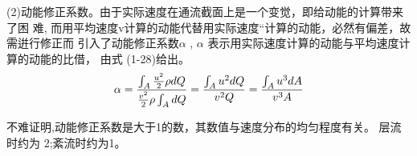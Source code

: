 (2)动能修正系数。由于实际速度在通流截面上是一个变觉，即给动能的计算带来了困 难,
而用平均速度v计算的动能代替用实际速度“计算的动能，必然有偏差，故需逬行修正而 
引入了动能修正系数$\alpha$ , $\alpha$ 表示用实际速度计算的动能与平均速度计算的动能的比借，
由式 (1-28)给出。
\[\alpha  = \frac{{\int_A {{\textstyle{{{u^2}} \over 2}}\rho dQ} }}{{{\textstyle{{{v^2}} \over 2}}\rho \int_A {dQ} }} = \frac{{\int_A {{u^2}dQ} }}{{{v^2}Q}} = \frac{{\int_A {{u^3}dA} }}{{{v^3}A}}\]

不难证明,动能修正系数是大于1的数，其数值与速度分布的均匀程度有关。
层流时约为 2;紊流时约为1。
